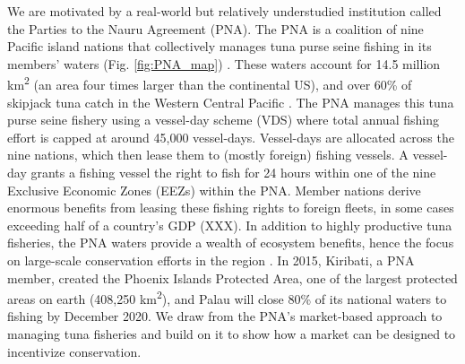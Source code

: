 \documentclass[12pt]{article}
\begin{document}
We are motivated by a real-world but relatively understudied institution called the Parties to the Nauru Agreement (PNA). The PNA is a coalition of nine Pacific island nations that collectively manages tuna purse seine fishing in its members' waters (Fig. \ref{fig:PNA_map}) \cite{havice_2013,aqorau_2018}. These waters account for 14.5 million km\textsuperscript{2} (an area four times larger than the continental US), and over 60\% of skipjack tuna catch in the Western Central Pacific \cite{havice_2013}. The PNA manages this tuna purse seine fishery using a vessel-day scheme (VDS) where total annual fishing effort is capped at around 45,000 vessel-days. Vessel-days are allocated across the nine nations, which then lease them to (mostly foreign) fishing vessels. A vessel-day grants a fishing vessel the right to fish for 24 hours within one of the nine Exclusive Economic Zones (EEZs) within the PNA. Member nations derive enormous benefits from leasing these fishing rights to foreign fleets, in some cases exceeding half of a country's GDP (XXX). In addition to highly productive tuna fisheries, the PNA waters provide a wealth of ecosystem benefits, hence the focus on large-scale conservation efforts in the region \cite{mcleod_2019}. In 2015, Kiribati, a PNA member, created the Phoenix Islands Protected Area, one of the largest protected areas on earth (408,250 km\textsuperscript{2}), and Palau will close 80\% of its national waters to fishing by December 2020. We draw from the PNA's market-based approach to managing tuna fisheries and build on it to show how a market can be designed to incentivize conservation.
\end{document}
